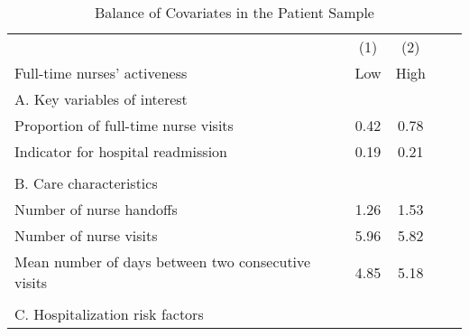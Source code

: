 \documentclass[final,12pt]{article}
\begin{document}
\begin{singlespace}
\newpage
\begin{table}[H]
\footnotesize
\setlength\tabcolsep{10pt}
\centering
\caption{Balance of Covariates in the Patient Sample}
\label{tab:balance}
\begin{threeparttable}
\def\sym#1{\ifmmode^{#1}\else\(^{#1}\)\fi}
\begin{tabular}{l*{4}c}
\toprule
 & (1) & (2)  \\
Full-time nurses' activeness & Low & High  \\
\midrule

\multicolumn{3}{l}{A. Key variables of interest}\\
Proportion of full-time nurse visits  & 0.42 & 0.78 \\
Indicator for hospital readmission & 0.19 & 0.21 \\

\\
\multicolumn{3}{l}{B. Care characteristics}\\

Number of nurse handoffs & 1.26  & 1.53 \\
Number of nurse visits  & 5.96 & 5.82 \\
Mean number of days between two consecutive visits & 4.85 & 5.18 \\
\\
\multicolumn{3}{l}{C. Hospitalization risk factors}\\


\end{tabular}
\end{threeparttable}
\end{table}
\end{singlespace}
\end{document}
